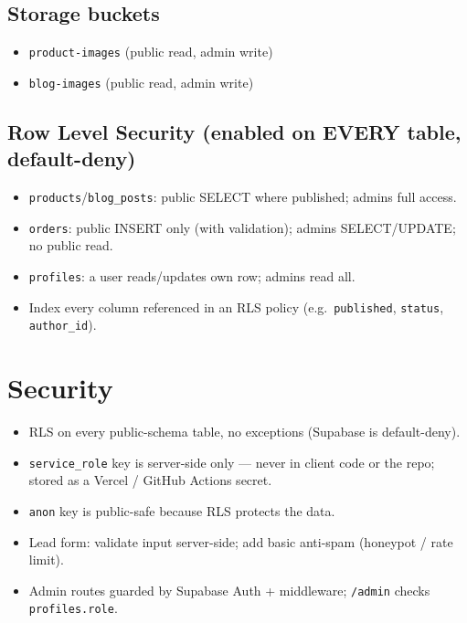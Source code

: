 \documentclass[11pt,a4paper]{article}
\begin{document}
\subsection{Storage buckets}
\begin{itemize}
  \item \texttt{product-images} (public read, admin write)
  \item \texttt{blog-images} (public read, admin write)
\end{itemize}

\subsection{Row Level Security (enabled on EVERY table, default-deny)}
\begin{itemize}
  \item \texttt{products}/\texttt{blog\_posts}: public SELECT where published; admins full access.
  \item \texttt{orders}: public INSERT only (with validation); admins SELECT/UPDATE; no public read.
  \item \texttt{profiles}: a user reads/updates own row; admins read all.
  \item Index every column referenced in an RLS policy (e.g.\ \texttt{published}, \texttt{status}, \texttt{author\_id}).
\end{itemize}

\section{Security}
\begin{itemize}
  \item RLS on every public-schema table, no exceptions (Supabase is default-deny).
  \item \texttt{service\_role} key is server-side only --- never in client code or the repo;
        stored as a Vercel / GitHub Actions secret.
  \item \texttt{anon} key is public-safe because RLS protects the data.
  \item Lead form: validate input server-side; add basic anti-spam (honeypot / rate limit).
  \item Admin routes guarded by Supabase Auth + middleware; \texttt{/admin} checks \texttt{profiles.role}.
\end{itemize}

\end{document}
